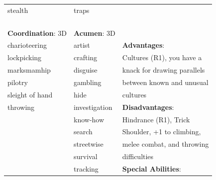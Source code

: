 \documentclass[10pt]{article}
\begin{document}
\begin{table}
\begin{tabular}{m{156pt} m{156pt} m{156pt}}
stealth              \hrulefill & traps                \hrulefill & \\

 \hrulefill &  \hrulefill & \\

 \hrulefill &  \hrulefill & \\

 \hrulefill &  \hrulefill & \\

 \hrulefill &  \hrulefill & \\


\textbf{Coordination}: 3D \hrulefill & \textbf{Acumen}: 3D \hrulefill     & \hrulefill \\

charioteering        \hrulefill & artist               \hrulefill & \textbf{Advantages}: \hrulefill \\

lockpicking          \hrulefill & crafting             \hrulefill & Cultures (R1), you have a \hrulefill \\

marksmamhip          \hrulefill & disguise             \hrulefill & knack for drawing parallels \hrulefill \\

pilotry              \hrulefill & gambling             \hrulefill & between known and unusual \hrulefill \\

sleight of hand      \hrulefill & hide                 \hrulefill & cultures \hrulefill \\

throwing             \hrulefill & investigation        \hrulefill & \textbf{Disadvantages}: \hrulefill \\

 \hrulefill & know-how             \hrulefill & Hindrance (R1), Trick \hrulefill \\

 \hrulefill & search               \hrulefill & Shoulder, +1 to climbing, \hrulefill \\

 \hrulefill & streetwise           \hrulefill & melee combat, and throwing \hrulefill \\

 \hrulefill & survival             \hrulefill & difficulties \hrulefill \\

 \hrulefill & tracking             \hrulefill & \textbf{Special Abilities}: \hrulefill \\


\end{tabular}
\end{table}
\end{document}
